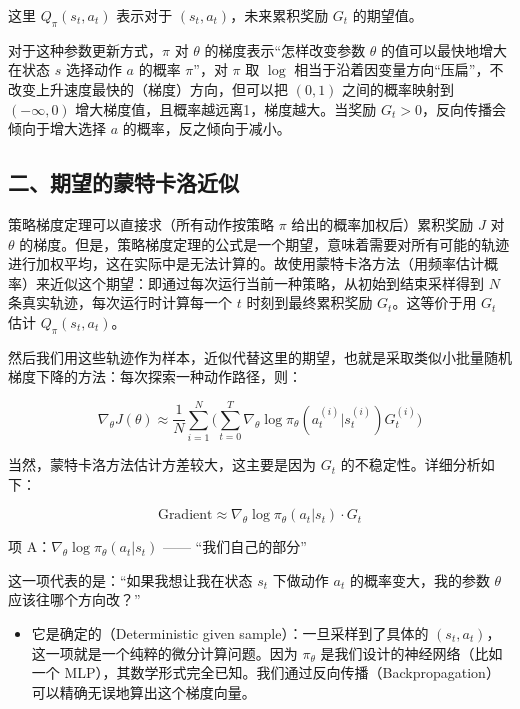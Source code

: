这里 \(Q_\pi(s_t,a_t)\) 表示对于 \((s_t,a_t)\)，未来累积奖励 \(G_t\) 的期望值。

对于这种参数更新方式，\(\pi\) 对 \(\theta\) 的梯度表示``怎样改变参数 \(\theta\) 的值可以最快地增大在状态 \(s\) 选择动作 \(a\) 的概率 \(\pi\)''，对 \(\pi\) 取 \(\log\) 相当于沿着因变量方向``压扁''，不改变上升速度最快的（梯度）方向，但可以把 \((0,1)\) 之间的概率映射到 \((-\infty,0)\) 增大梯度值，且概率越远离1，梯度越大。当奖励 \(G_t>0\)，反向传播会倾向于增大选择 \(a\) 的概率，反之倾向于减小。

\hypertarget{ux4e8cux671fux671bux7684ux8499ux7279ux5361ux6d1bux8fd1ux4f3c}{%
\subsection{二、期望的蒙特卡洛近似}\label{ux4e8cux671fux671bux7684ux8499ux7279ux5361ux6d1bux8fd1ux4f3c}}

策略梯度定理可以直接求（所有动作按策略 \(\pi\) 给出的概率加权后）累积奖励 \(J\) 对 \(\theta\) 的梯度。但是，策略梯度定理的公式是一个期望，意味着需要对所有可能的轨迹进行加权平均，这在实际中是无法计算的。故使用蒙特卡洛方法（用频率估计概率）来近似这个期望：即通过每次运行当前一种策略，从初始到结束采样得到 \(N\) 条真实轨迹，每次运行时计算每一个 \(t\) 时刻到最终累积奖励 \(G_t\)。这等价于用 \(G_t\) 估计 \(Q_\pi(s_t,a_t)\)。

然后我们用这些轨迹作为样本，近似代替这里的期望，也就是采取类似小批量随机梯度下降的方法：每次探索一种动作路径，则：

\[
\nabla_\theta J(\theta)
\approx
\frac{1}{N}\sum_{i=1}^{N}
\bigl(
\sum_{t=0}^{T}
\nabla_\theta\log\pi_\theta(a_t^{(i)}|s_t^{(i)})G_t^{(i)}
\bigr)
\]

当然，蒙特卡洛方法估计方差较大，这主要是因为 \(G_t\) 的不稳定性。详细分析如下：

\[
\text{Gradient}\approx\nabla_\theta\log\pi_\theta(a_t|s_t)\cdot G_t
\]

项 A：\(\nabla_\theta\log\pi_\theta(a_t|s_t)\) ------ ``我们自己的部分''

这一项代表的是：``如果我想让我在状态 \(s_t\) 下做动作 \(a_t\) 的概率变大，我的参数 \(\theta\) 应该往哪个方向改？''

\begin{itemize}
\tightlist
\item
  它是确定的（Deterministic given sample）：一旦采样到了具体的 \((s_t,a_t)\)，这一项就是一个纯粹的微分计算问题。因为 \(\pi_\theta\) 是我们设计的神经网络（比如一个 MLP），其数学形式完全已知。我们通过反向传播（Backpropagation）可以精确无误地算出这个梯度向量。
\end{itemize}

